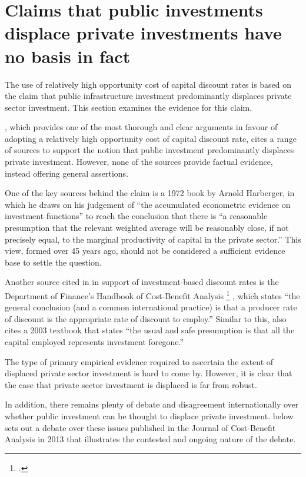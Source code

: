 \section{Claims that public investments displace private investments have no basis in fact}\label{section:Public-investment-may-not-displace-private-investment}

The use of relatively high opportunity cost of capital discount rates is based on the claim that public infrastructure investment predominantly displaces private sector investment. This section examines the evidence for this claim. 

\textcite{Harrison-Valuing-the-Future}, which provides one of the most thorough and clear arguments in favour of adopting a relatively high opportunity cost of capital discount rate, cites a range of sources to support the notion that public investment predominantly displaces private investment. However, none of the sources provide factual evidence, instead offering general assertions.

One of the key sources behind the claim is a 1972 book by Arnold Harberger, in which he draws on his judgement of “the accumulated econometric evidence on investment functions” to reach the conclusion that there is “a reasonable presumption that the relevant weighted average will be reasonably close, if not precisely equal, to the marginal productivity of capital in the private sector.”  This view, formed over 45 years ago, should not be considered a sufficient evidence base to settle the question. 

Another source cited in \textcite{Harrison-Valuing-the-Future} in support of investment-based discount rates is the Department of Finance’s Handbook of Cost-Benefit Analysis%
    \footcite{Dept-Finance-2006-Handbook-of-CBA}
, which states ``the general conclusion (and a common international practice) is that a producer rate of discount is the appropriate rate of discount to employ.''  Similar to this, \textcite{Harrison-Valuing-the-Future} also cites a 2003 textbook that states ``the usual and safe presumption is that all the capital employed represents investment foregone.'' 

The type of primary empirical evidence required to ascertain the extent of displaced private sector investment is hard to come by. However, it is clear that the case that private sector investment is displaced is far from robust. 

In addition, there remains plenty of debate and disagreement internationally over whether public investment can be thought to displace private investment.  below sets out a debate over these issues published in the Journal of Cost-Benefit Analysis in 2013 that illustrates the contested and ongoing nature of the debate.


